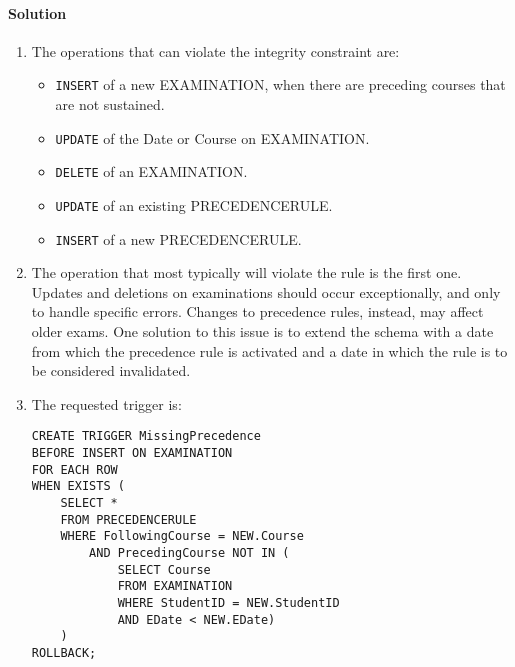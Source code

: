 \paragraph*{Solution}
\begin{enumerate}
    \item The operations that can violate the integrity constraint are: 
        \begin{itemize}
            \item \texttt{INSERT} of a new EXAMINATION, when there are preceding courses that are not sustained.
            \item \texttt{UPDATE} of the Date or Course on EXAMINATION.
            \item \texttt{DELETE} of an EXAMINATION.
            \item \texttt{UPDATE} of an existing PRECEDENCERULE.
            \item \texttt{INSERT} of a new PRECEDENCERULE.
        \end{itemize}
    \item The operation that most typically will violate the rule is the first one.
        Updates and deletions on examinations should occur exceptionally, and only to handle specific errors. 
        Changes to precedence rules, instead, may affect older exams.
        One solution to this issue is to extend the schema with a date from which the precedence rule is activated and a date in which the rule is to be considered invalidated.
    \item The requested trigger is: 
        \begin{lstlisting}[style=SQL]
CREATE TRIGGER MissingPrecedence
BEFORE INSERT ON EXAMINATION
FOR EACH ROW
WHEN EXISTS ( 
    SELECT *
    FROM PRECEDENCERULE
    WHERE FollowingCourse = NEW.Course 
        AND PrecedingCourse NOT IN (
            SELECT Course
            FROM EXAMINATION
            WHERE StudentID = NEW.StudentID
            AND EDate < NEW.EDate) 
    )
ROLLBACK;
        \end{lstlisting}
\end{enumerate}